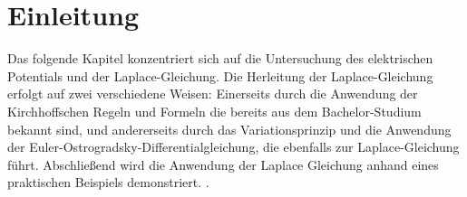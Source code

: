 %
%
%
%
\section{Einleitung\label{circuit:section:teil0}}
Das folgende Kapitel konzentriert sich auf die Untersuchung des elektrischen Potentials und der Laplace-Gleichung. Die Herleitung der Laplace-Gleichung erfolgt auf zwei verschiedene Weisen: Einerseits durch die Anwendung der Kirchhoffschen Regeln und Formeln die bereits aus dem Bachelor-Studium bekannt sind, und andererseits durch das Variationsprinzip und die Anwendung der Euler-Ostrogradsky-Differentialgleichung, die ebenfalls zur Laplace-Gleichung führt. Abschließend wird die Anwendung der Laplace Gleichung anhand eines praktischen Beispiels demonstriert. \cite{circuit:bibtex}.





